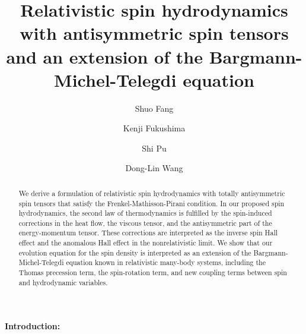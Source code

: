 \documentclass[prl,superscriptaddress,twocolumn,
  showpacs,preprintnumbers,amsmath,amssymb]{revtex4-1}
\begin{document}
\title{Relativistic spin hydrodynamics with antisymmetric spin tensors\\ and an extension of the Bargmann-Michel-Telegdi equation}

\author{Shuo Fang}


\author{Kenji Fukushima}

\author{Shi Pu}

\author{Dong-Lin Wang}

\begin{abstract}
We derive a formulation of relativistic spin hydrodynamics with totally antisymmetric spin tensors that satisfy the Frenkel-Mathisson-Pirani condition.  In our proposed spin hydrodynamics, the second law of thermodynamics is fulfilled by the spin-induced corrections in the heat flow, the viscous tensor, and the antisymmetric part of the energy-momentum tensor.  These corrections are interpreted as the inverse spin Hall effect and the anomalous Hall effect in the nonrelativistic limit.  We show that our evolution equation for the spin density is interpreted as an extension of the Bargmann-Michel-Telegdi equation known in relativistic many-body systems, including the Thomas precession term, the spin-rotation term, and new coupling terms between spin and hydrodynamic variables.
\end{abstract}
\maketitle



\paragraph*{Introduction:}
\end{document}
